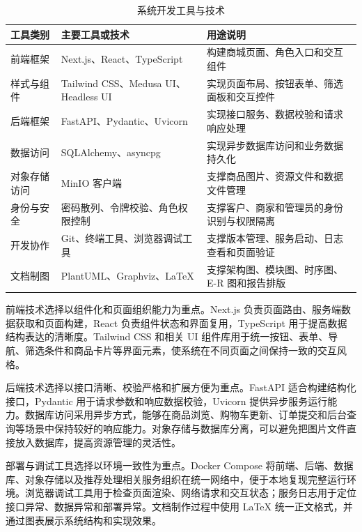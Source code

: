 ﻿\documentclass[oneside, UTF8]{ctexbook}
\begin{document}
\begin{table}[H]
  \centering
  \caption{系统开发工具与技术}
  \label{tab:implementation_dev_tools}
  \small
  \renewcommand{\arraystretch}{1.22}
  \begin{tabular}{p{}p{}p{}}
    \toprule
    工具类别 & 主要工具或技术 & 用途说明 \\
    \midrule
    前端框架 & Next.js、React、TypeScript & 构建商城页面、角色入口和交互组件 \\
    样式与组件 & Tailwind CSS、Medusa UI、Headless UI & 实现页面布局、按钮表单、筛选面板和交互控件 \\
    后端框架 & FastAPI、Pydantic、Uvicorn & 实现接口服务、数据校验和请求响应处理 \\
    数据访问 & SQLAlchemy、asyncpg & 实现异步数据库访问和业务数据持久化 \\
    对象存储访问 & MinIO 客户端 & 支撑商品图片、资源文件和数据文件管理 \\
    身份与安全 & 密码散列、令牌校验、角色权限控制 & 支撑客户、商家和管理员的身份识别与权限隔离 \\
    开发协作 & Git、终端工具、浏览器调试工具 & 支撑版本管理、服务启动、日志查看和页面验证 \\
    文档制图 & PlantUML、Graphviz、LaTeX & 支撑架构图、模块图、时序图、E-R 图和报告排版 \\
    \bottomrule
  \end{tabular}
\end{table}

前端技术选择以组件化和页面组织能力为重点。Next.js 负责页面路由、服务端数据获取和页面构建，React 负责组件状态和界面复用，TypeScript 用于提高数据结构表达的清晰度。Tailwind CSS 和相关 UI 组件库用于统一按钮、表单、导航、筛选条件和商品卡片等界面元素，使系统在不同页面之间保持一致的交互风格。

后端技术选择以接口清晰、校验严格和扩展方便为重点。FastAPI 适合构建结构化接口，Pydantic 用于请求参数和响应数据校验，Uvicorn 提供异步服务运行能力。数据库访问采用异步方式，能够在商品浏览、购物车更新、订单提交和后台查询等场景中保持较好的响应能力。对象存储与数据库分离，可以避免把图片文件直接放入数据库，提高资源管理的灵活性。

部署与调试工具选择以环境一致性为重点。Docker Compose 将前端、后端、数据库、对象存储以及推荐处理相关服务组织在统一网络中，便于本地复现完整运行环境。浏览器调试工具用于检查页面渲染、网络请求和交互状态；服务日志用于定位接口异常、数据异常和部署异常。文档制作过程中使用 LaTeX 统一正文格式，并通过图表展示系统结构和实现效果。
\end{document}
